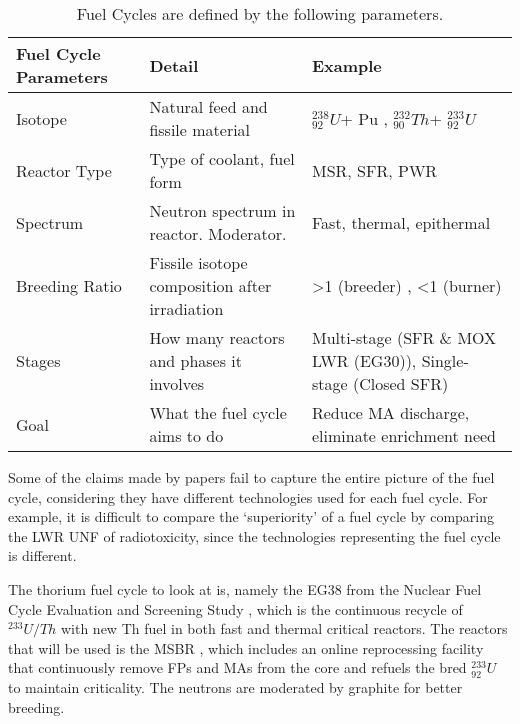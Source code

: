 \documentclass{article}
\newcommand{\uthree}{\xspace $^{233}_{92}U$ \xspace}
\newcommand{\ueight}{\xspace $^{238}_{92}U$\xspace}
\newcommand{\thor}{\xspace $^{232}_{90}Th$\xspace}
\begin{document}
\begin{table}[h]
    \centering
                \begin{tabularx}{\textwidth}{lbb}
                    \hline 
                    \textbf{Fuel Cycle Parameters} & \textbf{Detail} & \textbf{Example}\\
                    \hline
                    \hline
                    Isotope & Natural feed and fissile material & \ueight + Pu , \thor + \uthree \\
                    Reactor Type & Type of coolant, fuel form & \gls{MSR}, \gls{SFR}, \gls{PWR} \\ 
                    Spectrum & Neutron spectrum in reactor. Moderator. &  Fast, thermal, epithermal \\
                    Breeding Ratio & Fissile isotope composition after irradiation & >1 (breeder) , <1 (burner) \\
                    Stages & How many reactors and phases it involves & Multi-stage (\gls{SFR} \& MOX LWR (EG30)), Single-stage (Closed \gls{SFR}) \\
                    Goal & What the fuel cycle aims to do & Reduce \gls{MA} discharge, eliminate enrichment need\\
                    \hline
                \end{tabularx}
    \caption { Fuel Cycles are defined by the following parameters.}
    \label{tab:fc_param}

\end{table}



Some of the claims made by papers fail to capture
the entire picture of the fuel cycle, considering they have different
technologies used for each fuel cycle. For example, it is difficult
to compare the `superiority' of a fuel cycle by comparing the 
\gls{LWR} \gls{UNF} of radiotoxicity, since the technologies
representing the fuel cycle is different.

The thorium fuel cycle to look at is, namely the EG38
from the Nuclear Fuel Cycle Evaluation and Screening Study \cite{wigeland_nuclear_2014},
which is the continuous recycle of $^{233}U/Th$ with new
Th fuel in both fast and thermal critical reactors.
The reactors that will be used is the \gls{MSBR} \cite{robertson_conceptual_1971},
which includes an online reprocessing facility that
continuously remove \glspl{FP} and \glspl{MA} from the core
and refuels the bred \uthree to maintain criticality. 
The neutrons are moderated by graphite for better breeding.
\end{document}
